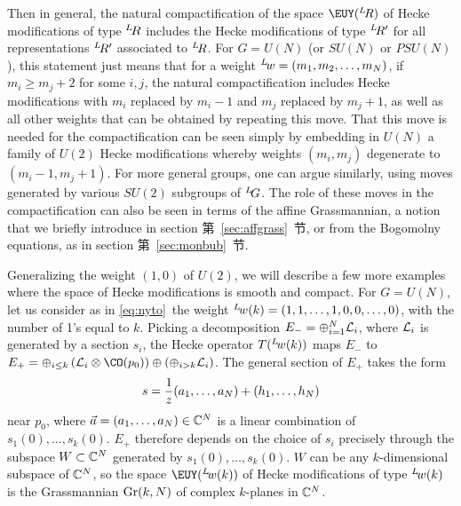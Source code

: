 Then in general, the natural compactification of the space
${{\EUY}}(^L\negthinspace R)$ of Hecke modifications of type
$^L\negthinspace R$ includes the Hecke modifications of type
$^L\negthinspace R'$ for all representations $^L\negthinspace R'$
associated to $^L\negthinspace R$.
 For $G=U(N)$ (or $SU(N)$ or $PSU(N)$), this
statement just means that for a weight $^L\negthinspace
w=(m_1,m_2,\dots,m_N)$, if $m_i\geq m_j+2$ for some $i,j$, the
natural compactification includes Hecke modifications with $m_i$
replaced by $m_i-1$ and $m_j$ replaced by $m_j+1$, as well as all
other weights that can be obtained by repeating this move. That
this move is needed for the compactification can be seen simply by
embedding in $U(N)$ a family of $U(2)$ Hecke modifications whereby
weights $(m_i,m_j)$ degenerate to $(m_i-1,m_j+1)$.   For more
general groups, one can argue similarly, using moves generated by
various $SU(2)$ subgroups of $^L\negthinspace G$.  The role of
these moves in the compactification can also be seen in terms of
the affine Grassmannian, a notion that we briefly introduce in
section 第~\ref{sec:affgrass}~节, or from the Bogomolny equations, as in section
第~\ref{sec:monbub}~节.

\par{}

Generalizing the weight $(1,0)$ of $U(2)$, we will describe a few
more examples where the space of Hecke modifications is smooth and
compact. For $G=U(N)$, let us consider as in \eqref{eq:nyto}\ the weight
$^L\negthinspace w(k)=(1,1,\dots,1,0,0,\dots,0)$, with the number
of 1's equal to $k$. Picking a decomposition
$E_-=\oplus_{i=1}^N{\cal L}_i$, where ${\cal L}_i$ is generated by
a section $s_i$, the Hecke operator $T({}^L\negthinspace w(k))$
maps $E_-$ to $E_+=\oplus_{i\leq k}\left({\cal L}_i\otimes
\CO(p_0)\right)\oplus\left(\oplus_{i>k}{\cal L}_i\right)$. The
general section of $E_+$ takes the form %
\setcounter{equation}{23}
\begin{equation}\label{eq:nson}
s={1\over
z}(a_1,\dots,a_N)+(h_1,\dots,h_N)
\end{equation}
 near $p_0$, where $\vec
a=(a_1,\dots,a_N)\in \Bbb{C}^N$ is a linear combination of
$s_1(0),\dots,s_k(0)$.  $E_+$ therefore depends on the choice of
$s_i$ precisely through the subspace $W\subset \Bbb{C}^N$
generated by $s_1(0),\dots,s_k(0)$.  $W$ can be any
$k$-dimensional subspace of $\Bbb{C}^N$, so the space
${{\EUY}}(^L\negthinspace w(k))$ of Hecke modifications of type
$^L\negthinspace w(k)$ is the Grassmannian ${\rm Gr}(k,N)$ of
complex $k$-planes in $\Bbb{C}^N$.

